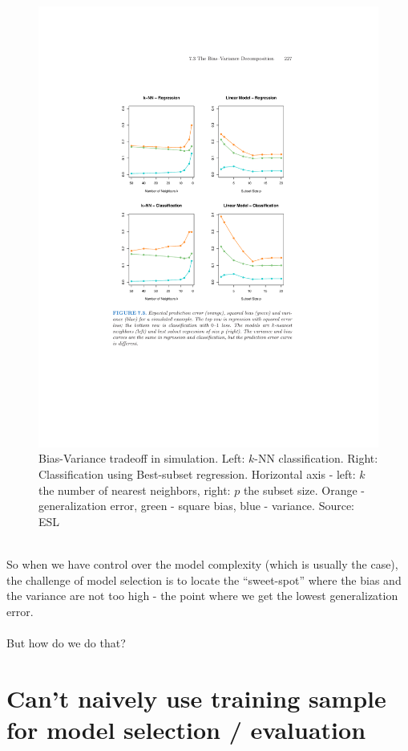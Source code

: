 \begin{figure}[H]
  \centering
  \includegraphics[width=4.5in]{esl_bias_variance_classification.pdf}
  \caption{Bias-Variance tradeoff in simulation. Left: $k$-NN classification. Right:
    Classification using Best-subset regression. Horizontal axis - left: $k$ the number of nearest
    neighbors, right: $p$ the subset size. Orange - generalization error, green
    - square bias, blue - variance.
  Source: ESL}
\end{figure}

~\\
So when we have control over the model complexity (which is usually the case),
the challenge of model selection is to locate the ``sweet-spot'' where the bias
and the variance are not too high - the point where we get the lowest
generalization error.
\\~\\
But how do we do that?



\section{Can't naively use training sample for model selection / evaluation}

